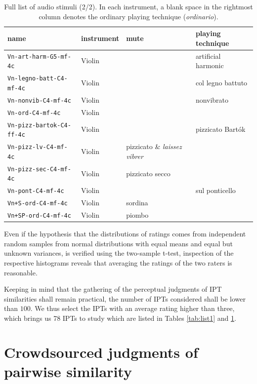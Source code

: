 \documentclass{bmcart}
\newcommand{\nmu}{}
\newcommand{\ipt}{IPT\xspace}
\newcommand{\ipts}{IPTs\xspace}
\begin{document}
\begin{backmatter}
\begin{table}
\caption{Full list of audio stimuli (2/2). In each instrument, a blank space in the rightmost column denotes the ordinary playing technique (\emph{ordinario}).}
\label{tab:list2}
\begin{tabular}{llll}
          name & instrument  & mute   &  playing technique \\ \hline \hline
          \texttt{Vn-art-harm-G5-mf-4c} & Violin & & artificial harmonic \\
          \texttt{Vn-legno-batt-C4-mf-4c} & Violin & & col legno battuto \\
          \texttt{Vn-nonvib-C4-mf-4c} & Violin & & nonvibrato \\
          \texttt{Vn-ord-C4-mf-4c} & Violin & & \\
          \texttt{Vn-pizz-bartok-C4-ff-4c} & Violin & & pizzicato Bart\'ok \\
          \texttt{Vn-pizz-lv-C4-mf-4c} & Violin & pizzicato \& \emph{laissez vibrer} \\
          \texttt{Vn-pizz-sec-C4-mf-4c} & Violin & pizzicato secco \\
          \texttt{Vn-pont-C4-mf-4c} & Violin & & sul ponticello \\
          \texttt{Vn+S-ord-C4-mf-4c} & Violin & sordina & \\
          \texttt{Vn+SP-ord-C4-mf-4c} & Violin & piombo & \\ \hline
\end{tabular}
\end{table}

Even if the hypothesis that the distributions of ratings comes from independent random samples from normal distributions with equal means and equal but unknown variances, is verified using the two-sample t-test, inspection of the respective histograms reveals that averaging the ratings of the two raters is reasonable.

Keeping in mind that the gathering of the perceptual judgments of \ipt similarities shall remain practical, the number of \ipts considered shall be lower than $100$. We thus select the \ipts with an average rating higher than three, which brings us 78 \ipts to study which are listed in Tables \ref{tab:list1} and \ref{tab:list2}.

\section*{\nmu Crowdsourced judgments of pairwise similarity}


\end{backmatter}
\end{document}

